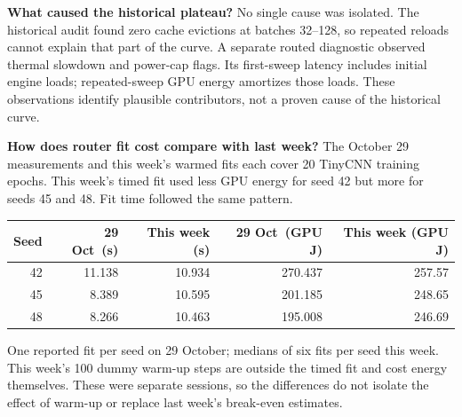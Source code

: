 \documentclass[10pt,a4paper]{article}
\newcommand{\smallcap}[1]{{\footnotesize\color{navy}#1}\par}
\begin{document}
\textbf{What caused the historical plateau?}
No single cause was isolated. The historical audit found zero cache evictions at batches 32--128, so repeated reloads cannot explain that part of the curve. A separate routed diagnostic observed thermal slowdown and power-cap flags. Its first-sweep latency includes initial engine loads; repeated-sweep GPU energy amortizes those loads. These observations identify plausible contributors, not a proven cause of the historical curve.

\textbf{How does router fit cost compare with last week?} The October 29 measurements and this week's warmed fits each cover 20 TinyCNN training epochs. This week's timed fit used less GPU energy for seed 42 but more for seeds 45 and 48. Fit time followed the same pattern.
\begin{center}
\hfill
{}
\end{center}\vspace{-5pt}
\begin{center}\small
\begin{tabular}{@{}rrrrr@{}}\toprule
Seed & 29 Oct\ (s) & This week (s) & 29 Oct\ (GPU J) & This week (GPU J)\\
\midrule
42 & 11.138 & 10.934 & 270.437 & 257.57\\
45 & 8.389 & 10.595 & 201.185 & 248.65\\
48 & 8.266 & 10.463 & 195.008 & 246.69\\
\bottomrule\end{tabular}
\end{center}
\smallcap{One reported fit per seed on 29 October; medians of six fits per seed this week. This week's 100 dummy warm-up steps are outside the timed fit and cost energy themselves. These were separate sessions, so the differences do not isolate the effect of warm-up or replace last week's break-even estimates.}
\end{document}

